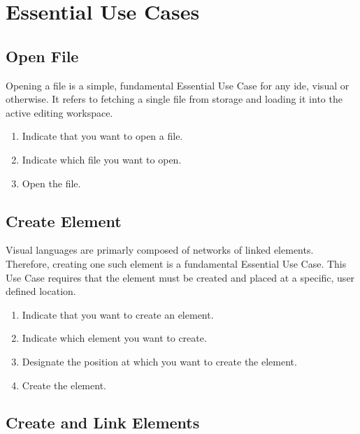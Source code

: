 \section{Essential Use Cases}

\subsection{Open File}
\label{app:euc_open}

Opening a file is a simple, fundamental Essential Use Case for any
\ac{ide}, visual or otherwise. It refers to fetching a single file from
storage and loading it into the active editing workspace.

\begin{enumerate}
  \item Indicate that you want to open a file.
  \item Indicate which file you want to open.
  \item Open the file.
\end{enumerate}

\subsection{Create Element}

Visual languages are primarly composed of networks of linked elements.
Therefore, creating one such element is a fundamental Essential Use Case.
This Use Case requires that the element must be created and placed at a
specific, user defined location.

\begin{enumerate}
  \item Indicate that you want to create an element.
  \item Indicate which element you want to create.
  \item Designate the position at which you want to create the element.
  \item Create the element.
\end{enumerate}

\subsection{Create and Link Elements}

